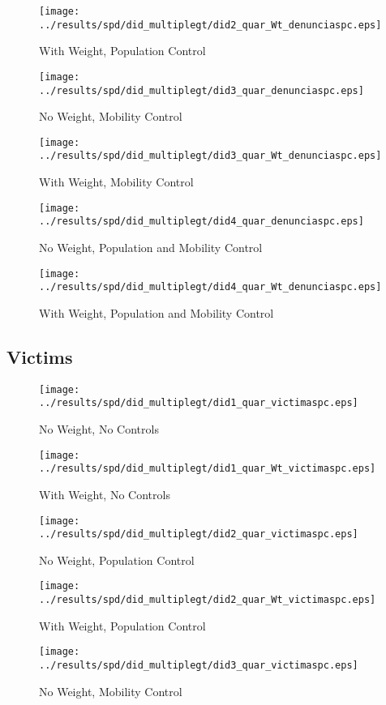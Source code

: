 \documentclass[11pt,letterpaper]{article}
\begin{document}
\begin{figure}[H]
\caption{With Weight, Population Control}
\centering
\texttt{[image: ../results/spd/did\_multiplegt/did2\_quar\_Wt\_denunciaspc.eps]}
\end{figure}
\begin{figure}[H]
\caption{No Weight, Mobility Control}
\centering
\texttt{[image: ../results/spd/did\_multiplegt/did3\_quar\_denunciaspc.eps]}
\end{figure}

\begin{figure}[H]
\caption{With Weight, Mobility Control}
\centering
\texttt{[image: ../results/spd/did\_multiplegt/did3\_quar\_Wt\_denunciaspc.eps]}
\end{figure}
\begin{figure}[H]
\caption{No Weight, Population and Mobility Control}
\centering
\texttt{[image: ../results/spd/did\_multiplegt/did4\_quar\_denunciaspc.eps]}
\end{figure}

\begin{figure}[H]
\caption{With Weight, Population and Mobility Control}
\centering
\texttt{[image: ../results/spd/did\_multiplegt/did4\_quar\_Wt\_denunciaspc.eps]}
\end{figure}

	\subsection{Victims}
\begin{figure}[H]
\caption{No Weight, No Controls}
\centering
\texttt{[image: ../results/spd/did\_multiplegt/did1\_quar\_victimaspc.eps]}
\end{figure}

\begin{figure}[H]
\caption{With Weight, No Controls}
\centering
\texttt{[image: ../results/spd/did\_multiplegt/did1\_quar\_Wt\_victimaspc.eps]}
\end{figure}
\begin{figure}[H]
\caption{No Weight, Population Control}
\centering
\texttt{[image: ../results/spd/did\_multiplegt/did2\_quar\_victimaspc.eps]}
\end{figure}

\begin{figure}[H]
\caption{With Weight, Population Control}
\centering
\texttt{[image: ../results/spd/did\_multiplegt/did2\_quar\_Wt\_victimaspc.eps]}
\end{figure}
\begin{figure}[H]
\caption{No Weight, Mobility Control}
\centering
\texttt{[image: ../results/spd/did\_multiplegt/did3\_quar\_victimaspc.eps]}
\end{figure}
\end{document}
